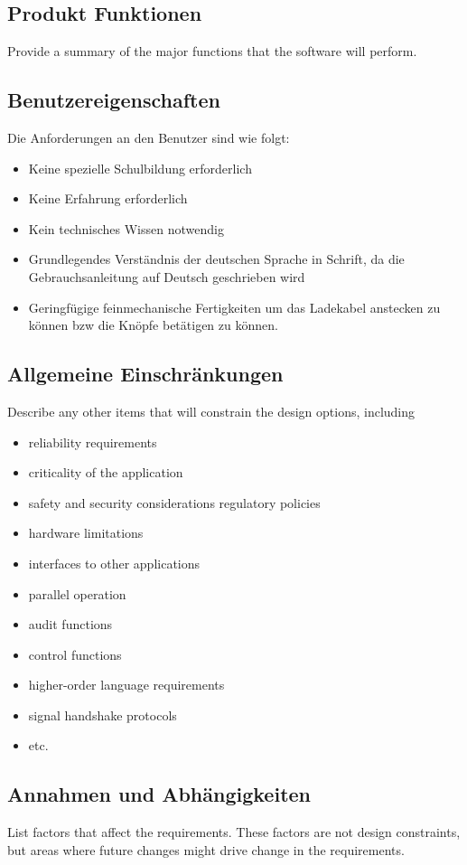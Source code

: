 \subsection{Produkt Funktionen}
Provide a summary of the major functions that the software will perform.

\subsection{Benutzereigenschaften}
Die Anforderungen an den Benutzer sind wie folgt:
\begin{itemize}
	\item Keine spezielle Schulbildung erforderlich
	\item Keine Erfahrung erforderlich
	\item Kein technisches Wissen notwendig
	\item Grundlegendes Verständnis der deutschen Sprache in Schrift, da die Gebrauchsanleitung auf Deutsch geschrieben wird
	\item Geringfügige feinmechanische Fertigkeiten um das Ladekabel anstecken zu können bzw die Knöpfe betätigen zu können.
\end{itemize}

\subsection{Allgemeine Einschränkungen}
Describe any other items that will constrain the design options, including
\begin{itemize}
	\item reliability requirements
	\item criticality of the application
	\item safety and security considerations regulatory policies
	\item hardware limitations
	\item interfaces to other applications
	\item parallel operation
	\item audit functions
	\item control functions
	\item higher-order language requirements
	\item signal handshake protocols
	\item etc.
\end{itemize}

\subsection{Annahmen und Abhängigkeiten}
List factors that affect the requirements. These factors are not design constraints, but areas where future changes might drive change in the requirements.


